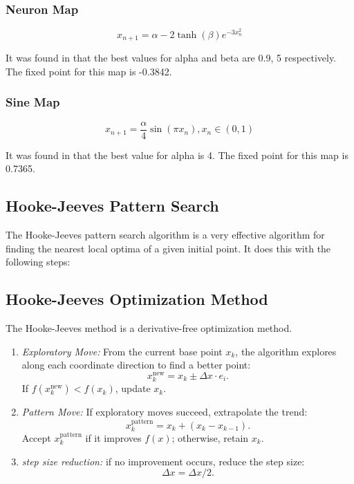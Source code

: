 \documentclass[conference]{IEEEtran}
\begin{document}
\subsubsection{Neuron Map}
\[x_{n+1} = \alpha - 2 \tanh{(\beta)} e^{-3x_n^2}\]


It was found in \cite{raniAnalysisChaoticMaps2023} that the best values for alpha and beta are 0.9, 5 respectively. The fixed point for this map is -0.3842.

\subsubsection{Sine Map}\cite{demirChaoticOptimizationMethod2020}
\[x_{n+1} = \frac{\alpha}{4} \sin{(\pi x_n)}, x_n \in (0,1)\]

It was found in \cite{raniAnalysisChaoticMaps2023} that the best value for alpha is 4. The fixed point for this map is 0.7365.

\subsection{Hooke-Jeeves Pattern Search}

The Hooke-Jeeves pattern search algorithm is a very effective algorithm for finding the nearest local optima of a given initial point. It does this with the following steps:

\subsection{Hooke-Jeeves Optimization Method}
The Hooke-Jeeves method is a derivative-free optimization method.

\begin{enumerate}
    \item \textit{Exploratory Move:} From the current base point \( x_k \), the algorithm explores along each coordinate direction to find a better point:
    \[
    x_k^{\text{new}} = x_k \pm \Delta x \cdot e_i.
    \]
    If \( f(x_k^{\text{new}}) < f(x_k) \), update \( x_k \).

    \item \textit{Pattern Move:} If exploratory moves succeed, extrapolate the trend:
    \[
    x_k^{\text{pattern}} = x_k + (x_k - x_{k-1}).
    \]
    Accept \( x_k^{\text{pattern}} \) if it improves \( f(x) \); otherwise, retain \( x_k \).

    \item \textit{step size reduction:} if no improvement occurs, reduce the step size:
    \[
    \Delta x = \Delta x / 2.
    \]
\end{enumerate}
\end{document}
